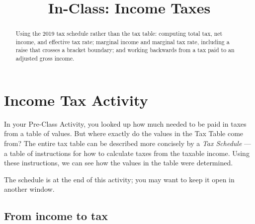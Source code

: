 \documentclass[12pt]{ximera}
\title{In-Class: Income Taxes}
\begin{document}
\begin{abstract}
Using the 2019 tax schedule rather than the tax table: computing total tax, net
income, and effective tax rate; marginal income and marginal tax rate, including a
raise that crosses a bracket boundary; and working backwards from a tax paid to an
adjusted gross income.
\end{abstract}
\maketitle

\section*{Income Tax Activity}

In your Pre-Class Activity, you looked up how much needed to be paid in taxes from a
table of values. But where exactly do the values in the Tax Table come from? The
entire tax table can be described more concisely by a \emph{Tax Schedule} --- a table
of instructions for how to calculate taxes from the taxable income. Using these
instructions, we can see how the values in the table were determined.

The schedule is at the end of this activity; you may want to keep it open in another
window.

\subsection*{From income to tax}
\end{document}
